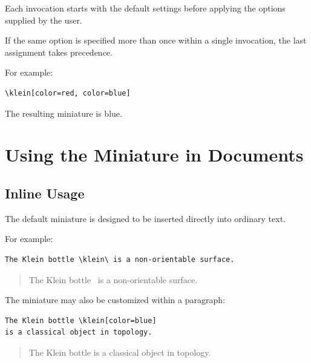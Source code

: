 \documentclass[12pt,a4paper]{article}
\begin{document}
\begin{center}
    \klein[color=red,scale=3]
    \qquad
    \klein
    \qquad
    \klein[color=blue,rotate=90]
    \qquad
    \klein
\end{center}

Each invocation starts with the default settings
before applying the options supplied by the user.

If the same option is specified more than once
within a single invocation, the last assignment
takes precedence.

For example:

\begin{verbatim}
\klein[color=red, color=blue]
\end{verbatim}

\begin{center}
    \klein[color=red,color=blue]
\end{center}

The resulting miniature is blue.

\section{Using the Miniature in Documents}

\subsection{Inline Usage}

The default miniature is designed to be inserted
directly into ordinary text.

For example:

\begin{verbatim}
The Klein bottle \klein\ is a non-orientable surface.
\end{verbatim}

\begin{quote}
The Klein bottle \klein\ is a non-orientable surface.
\end{quote}

The miniature may also be customized within a
paragraph:

\begin{verbatim}
The Klein bottle \klein[color=blue]
is a classical object in topology.
\end{verbatim}

\begin{quote}
The Klein bottle \klein[color=blue]
is a classical object in topology.
\end{quote}
\end{document}

